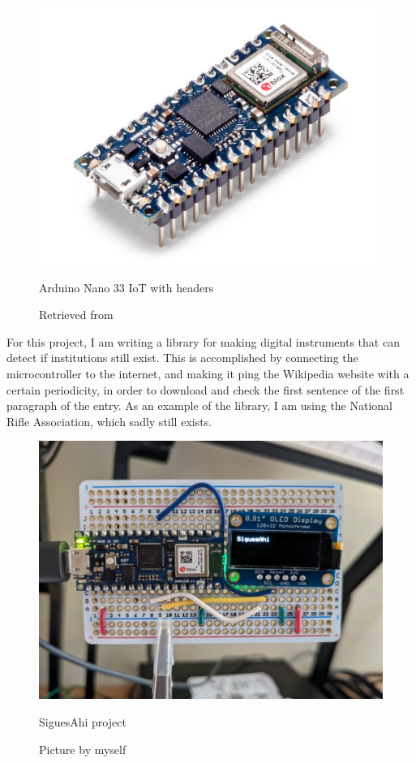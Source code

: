 \begin{figure}[ht]
  \centering
  \includegraphics[width=0.75\linewidth,height=0.25\textheight,keepaspectratio]{images/arduino-nano-33-iot-with-headers.jpg}
  \caption{Arduino Nano 33 IoT with headers}
  \caption*{Retrieved from \cite{website-arduino-nano-33-iot-with-headers}}
  \label{}
\end{figure}

For this project, I am writing a library for making digital instruments that can detect if institutions still exist. This is accomplished by connecting the microcontroller to the internet, and making it ping the Wikipedia website with a certain periodicity, in order to download and check the first sentence of the first paragraph of the entry. As an example of the library, I am using the National Rifle Association, which sadly still exists.

\begin{figure}[ht]
  \centering
  \includegraphics[width=0.75\linewidth,height=0.25\textheight,keepaspectratio]{images/siguesahi.jpg}
  \caption{SiguesAhi project}
  \caption*{Picture by myself}
  \label{fig:siguesahi}
\end{figure}

